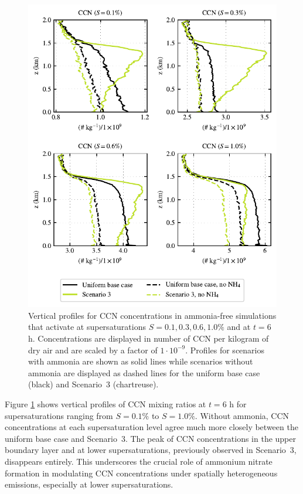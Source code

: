 \documentclass[journal abbreviation, manuscript]{copernicus}
\begin{document}
\begin{figure}[!h]
	\centering
	\includegraphics[]{figures/aerosol-ccn-vertical-profiles-no-nh4-cases-time36.pdf}
	\caption{Vertical profiles for CCN concentrations in
          ammonia-free simulations that activate at supersaturations
          $S=0.1, 0.3, 0.6, 1.0\%$ and at $t=6$ h. Concentrations are
          displayed in number of CCN per kilogram of dry air and are
          scaled by a factor of $1\cdot10^{-9}$. Profiles for
          scenarios with ammonia are shown as solid lines while
          scenarios without ammonia are displayed as dashed lines for
          the uniform base case (black) and Scenario~3
          (chartreuse).}
	\label{fig:ccn-vertical-profile-no-ammonia}
\end{figure}

Figure \ref{fig:ccn-vertical-profile-no-ammonia} shows vertical
profiles of CCN mixing ratios at $t=6$ h for supersaturations ranging
from $S=0.1\%$ to $S=1.0\%$. Without ammonia, CCN concentrations at
each supersaturation level agree much more closely between the uniform
base case and Scenario~3. The peak of CCN concentrations in the upper
boundary layer and at lower supersaturations, previously observed in
Scenario~3, disappears entirely. This underscores the crucial role of
ammonium nitrate formation in modulating CCN concentrations under
spatially heterogeneous emissions, especially at lower
supersaturations.
\end{document}
